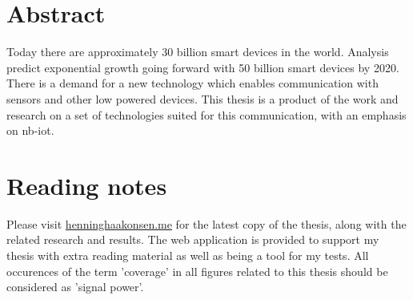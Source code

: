
\vspace*{2cm}
\thispagestyle{plain}

\section*{Abstract} \label{section:abstract}

Today there are approximately 30 billion smart devices in the world. Analysis predict exponential growth going forward with 50 billion smart devices by 2020. There is a demand for a new technology which enables communication with sensors and other low powered devices. This thesis is a product of the work and research on a set of technologies suited for this communication, with an emphasis on \acrshort{nb-iot}.

\section*{Reading notes} \label{section:readingnotes}

Please visit \url{henninghaakonsen.me} for the latest copy of the thesis, along with the related research and results. The web application is provided to support my thesis with extra reading material as well as being a tool for my tests. All occurences of the term 'coverage' in all figures related to this thesis should be considered as 'signal power'. 
